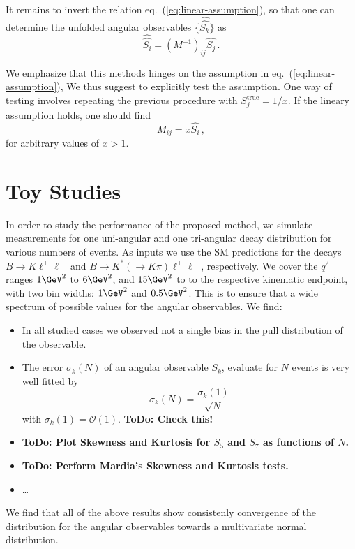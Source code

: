 \documentclass[aps,prd,reprint,nofootinbib,preprintnumbers]{revtex4}
\newcommand{\refeq}[1]{eq.~(\ref{eq:#1})}
\newcommand{\order}[1]{\mathcal{O}\left({#1}\right)}
\newcommand{\est}[1]{\widehat{#1}}
\newcommand{\wwhat}[1]{\widehat{\widehat{#1}}}
\newcommand{\todo}[1]{{\color{red}\bf ToDo: #1}}
\begin{document}
It remains to invert the relation \refeq{linear-assumption}, so that one can determine the unfolded
angular observables $\lbrace \wwhat{S_k}\rbrace$ as
\begin{equation}
    \wwhat{S_i} = \left(M^{-1}\right)_{ij} \est{S_j}\,.
\end{equation}

We emphasize that this methods hinges on the assumption in \refeq{linear-assumption}, We thus suggest to explicitly
test the assumption. One way of testing involves repeating the previous procedure
with $S_j^\text{true} = 1/x$. If the lineary assumption holds, one should find
\begin{equation}
    M_{ij} = x \est{S_i}\,,
\end{equation}
for arbitrary values of $x > 1$.


\section{Toy Studies}
\label{sec:numerics}

In order to study the performance of the proposed method, we simulate measurements for one uni-angular
and one tri-angular decay distribution for various numbers of events. As inputs we use the SM predictions
for the decays $B\to K\ell^+\ell^-$ and $B\to K^*(\to K\pi)\ell^+\ell^-$, respectively. We cover the
$q^2$ ranges $1\GeV^2$ to $6\GeV^2$, and $15\GeV^2$ to to the respective kinematic endpoint, with two
bin widths: $1\GeV^2$ and $0.5\GeV^2$. This is to ensure that a wide spectrum of possible values for
the angular observables. We find:
\begin{itemize}
    \item In all studied cases we observed not a single bias in the pull distribution of the observable.
    \item The error $\sigma_k(N)$ of an angular observable $S_k$, evaluate for $N$ events is very well
        fitted by
        \begin{equation}
            \sigma_k(N) = \frac{\sigma_k(1)}{\sqrt{N}}
        \end{equation}
        with $\sigma_k(1) = \order{1}$. \todo{Check this!}
    \item \todo{Plot Skewness and Kurtosis for $S_5$ and $S_7$ as functions of $N$.}
    \item \todo{Perform Mardia's Skewness and Kurtosis tests.}
    \item \dots
\end{itemize}
We find that all of the above results show consistenly convergence of the distribution for the angular observables
towards a multivariate normal distribution.
\end{document}
